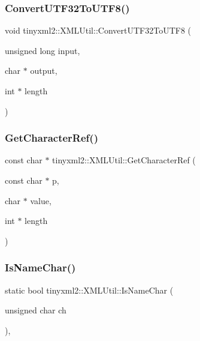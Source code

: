 \subsubsection{\texorpdfstring{Convert\+U\+T\+F32\+To\+U\+T\+F8()}{ConvertUTF32ToUTF8()}}
{\footnotesize\ttfamily void tinyxml2\+::\+X\+M\+L\+Util\+::\+Convert\+U\+T\+F32\+To\+U\+T\+F8 (\begin{DoxyParamCaption}\item[{unsigned long}]{input,  }\item[{char $\ast$}]{output,  }\item[{int $\ast$}]{length }\end{DoxyParamCaption})\hspace{0.3cm}{\ttfamily [static]}}

\mbox{\label{classtinyxml2_1_1_x_m_l_util_a5a96e5144a8d693dc4bcd783d9964648}} 
\subsubsection{\texorpdfstring{Get\+Character\+Ref()}{GetCharacterRef()}}
{\footnotesize\ttfamily const char $\ast$ tinyxml2\+::\+X\+M\+L\+Util\+::\+Get\+Character\+Ref (\begin{DoxyParamCaption}\item[{const char $\ast$}]{p,  }\item[{char $\ast$}]{value,  }\item[{int $\ast$}]{length }\end{DoxyParamCaption})\hspace{0.3cm}{\ttfamily [static]}}

\mbox{\label{classtinyxml2_1_1_x_m_l_util_a04b17341538fa11752f24b4301d19485}} 
\subsubsection{\texorpdfstring{Is\+Name\+Char()}{IsNameChar()}}
{\footnotesize\ttfamily static bool tinyxml2\+::\+X\+M\+L\+Util\+::\+Is\+Name\+Char (\begin{DoxyParamCaption}\item[{unsigned char}]{ch }\end{DoxyParamCaption})\hspace{0.3cm}{\ttfamily [inline]}, {\ttfamily [static]}}

